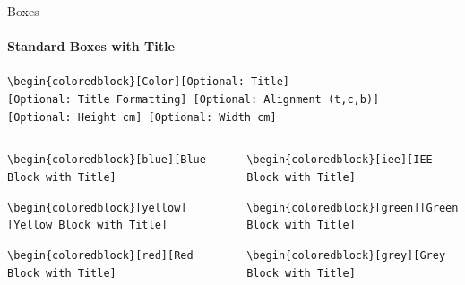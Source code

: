 \documentclass[aspectratio=169]{beamer}
\begin{document}
\begin{frame}{Boxes}
    \framesubtitle{Standard Boxes with Title}

    \begin{coloredblock}[grey]
        \footnotesize\centering\texttt{\textbackslash begin\{coloredblock\}[Color][Optional:~Title][Optional:~Title~Formatting] [Optional:~Alignment (t,c,b)][Optional:~Height~cm] [Optional:~Width~cm]}
    \end{coloredblock}

    \vspace{-1cm}
    \begin{columns}
        \begin{column}{0.49\textwidth}
    
            \begin{coloredblock}
                \footnotesize\texttt{\textbackslash begin\{coloredblock\}[blue][Blue Block with Title]}\strut
            \end{coloredblock}
    
            \begin{coloredblock}
                \footnotesize\texttt{\textbackslash begin\{coloredblock\}[yellow][Yellow Block with Title]}\strut
            \end{coloredblock}

            \begin{coloredblock}
                \footnotesize\texttt{\textbackslash begin\{coloredblock\}[red][Red Block with Title]}\strut
            \end{coloredblock}
        
        \end{column}
        \begin{column}{0.49\textwidth}
    
            \begin{coloredblock}
                \footnotesize\texttt{\textbackslash begin\{coloredblock\}[iee][IEE Block with Title]}\strut
            \end{coloredblock}
    
            \begin{coloredblock}
                \footnotesize\texttt{\textbackslash begin\{coloredblock\}[green][Green Block with Title]}\strut
            \end{coloredblock}
    
            \begin{coloredblock}
                \footnotesize\texttt{\textbackslash begin\{coloredblock\}[grey][Grey Block with Title]}\strut
            \end{coloredblock}
        \end{column}
    \end{columns}

\end{frame}
\end{document}
